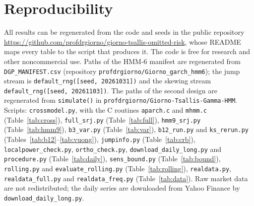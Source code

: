\documentclass[11pt,a4paper]{article}
\theoremstyle{definition}
\theoremstyle{remark}
\begin{document}
\section{Reproducibility}
All results can be regenerated from the code and seeds in the public repository \url{https://github.com/profdrgiorno/giorno-tsallis-omitted-risk}, whose README maps every table to the script that produces it. The code is free for research and other noncommercial use. Paths of the HMM-6 manifest are regenerated from \texttt{DGP\_MANIFEST.csv} (repository \texttt{profdrgiorno/\allowbreak Giorno\_garch\_hmm6}); the jump stream is \texttt{default\_rng([seed, 20261031])} and the skewing stream \texttt{default\_rng([seed, 20261103])}. The paths of the second design are regenerated from \texttt{simulate()} in \texttt{profdrgiorno/\allowbreak Giorno-Tsallis-Gamma-HMM}. Scripts: \texttt{crossmodel.py}, with the C routines \texttt{aparch.c} and \texttt{mhmm.c} (Table~\ref{tab:cross}), \texttt{full\_srj.py} (Table~\ref{tab:full}), \texttt{hmm9\_srj.py} (Table~\ref{tab:hmm9}), \texttt{b3\_var.py} (Table~\ref{tab:var}), \texttt{b12\_run.py} and \texttt{ks\_rerun.py} (Tables~\ref{tab:b12}--\ref{tab:vuong}), \texttt{jumpinfo.py} (Table~\ref{tab:crb}), \texttt{localpower\_check.py}, \texttt{ortho\_check.py}, \texttt{download\_daily\_long.py} and \texttt{procedure.py} (Table~\ref{tab:daily}), \texttt{sens\_bound.py} (Table~\ref{tab:bound}), \texttt{rolling.py} and \texttt{evaluate\_rolling.py} (Table~\ref{tab:rolling}), \texttt{realdata.py}, \texttt{realdata\_full.py} and \texttt{realdata\_freq.py} (Table~\ref{tab:data}). Raw market data are not redistributed; the daily series are downloaded from Yahoo Finance by \texttt{download\_daily\_long.py}.
\end{document}
